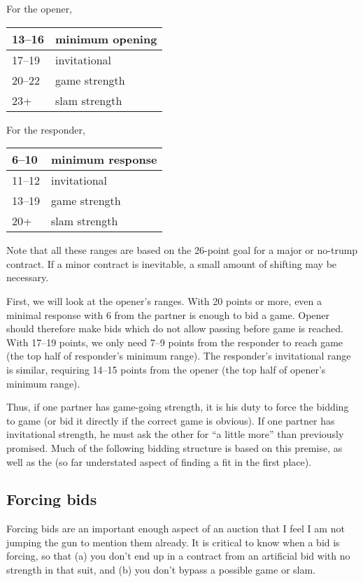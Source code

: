 \documentclass[11pt]{article}
\begin{document}
\begin{minipage}[t]{0.5\columnwidth}
For the opener,\\
\begin{tabular}{|l|l|}\hline
13--16 & minimum opening\\\hline
17--19 & invitational\\\hline
20--22 & game strength\\\hline
23+    & slam strength\\\hline
\end{tabular}
\end{minipage}
\begin{minipage}[t]{0.5\columnwidth}
For the responder,\\
\begin{tabular}{|l|l|}\hline
6--10  & minimum response\\\hline
11--12 & invitational\\\hline
13--19 & game strength \\\hline
20+    & slam strength\\\hline
\end{tabular}
\end{minipage}

Note that all these ranges are based on the 26-point goal for
a major or no-trump contract.  If a minor contract is inevitable,
a small amount of shifting may be necessary.

First, we will look at the opener's ranges.  With 20 points or more,
even a minimal response with 6 from the partner is enough to bid
a game.  Opener should therefore make bids which do not allow passing
before game is reached.  With 17--19 points, we only need 7--9 points
from the responder to reach game (the top half of responder's minimum
range).  The responder's invitational range is similar, requiring
14--15 points from the opener (the top half of opener's minimum range).

Thus, if one partner has game-going strength, it is his duty to
force the bidding to game (or bid it directly if the correct game
is obvious).  If one partner has invitational strength, he must ask
the other for ``a little more'' than previously promised.  Much of the
following bidding structure is based on this premise, as well as the
(so far understated aspect of finding a fit in the first place).

\subsection{Forcing bids}
Forcing bids are an important enough aspect of an auction that I
feel I am not jumping the gun to mention them already.  It is
critical to know when a bid is forcing, so that (a) you don't end
up in a contract from an artificial bid with no strength in that
suit, and (b) you don't bypass a possible game or slam.
\end{document}
